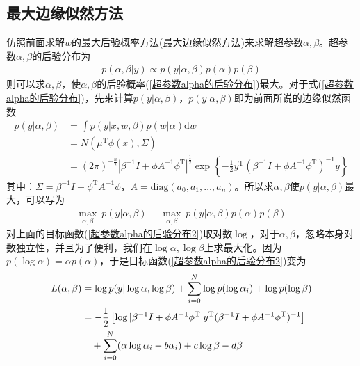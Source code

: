     \subsection{最大边缘似然方法}
        \par
        仿照前面求解$w$的最大后验概率方法(最大边缘似然方法)来求解超参数$\alpha,\beta$。超参数$\alpha,\beta$的后验分布为
        \begin{align}
        \label{超参数alpha的后验分布}
        p(\alpha,\beta|y) \propto p(y|\alpha,\beta) p(\alpha) p(\beta)
        \end{align}
        则可以求$\alpha,\beta$，使$\alpha,\beta$的后验概率(\ref{超参数alpha的后验分布})最大。对于式(\ref{超参数alpha的后验分布})，先来计算$p(y|\alpha,\beta)$，$p(y|\alpha,\beta)$即为前面所说的边缘似然函数
        \begin{align*}
        p(y|\alpha,\beta) &= \int p(y|x,w,\beta) p(w|\alpha) \mathrm{d}w\\
        &=N(\mu ^\mathrm{T}\phi(x),\Sigma) \\
        &=(2\pi)^{-\frac{n}{2}} |\beta^{-1}I + \phi A^{-1}\phi^\mathrm{T} |^{\frac{1}{2}} \exp\left\{ -\frac{1}{2} y^\mathrm{T} (\beta^{-1}I + \phi A^{-1}\phi^\mathrm{T})^{-1}y  \right\}
        \end{align*}
        其中：$\Sigma = \beta^{-1}I + \phi^\mathrm{T}A^{-1}\phi $，$A = \mathrm{diag}(a_0,a_1,\dots,a_n)$。所以求$\alpha,\beta$使$p(y|\alpha,\beta)$最大，可以写为
        \begin{align}
        \label{超参数alpha的后验分布2}
        \max_{\alpha,\beta} \ p(y|\alpha,\beta) \equiv \max_{\alpha,\beta} \ p(y|\alpha,\beta) p(\alpha)p(\beta)
        \end{align}
        对上面的目标函数(\ref{超参数alpha的后验分布2})取对数$\log$，对于$\alpha,\beta$，忽略本身对数独立性，并且为了便利，我们在$\log \alpha,\log \beta$上求最大化。因为$p(\log \alpha) = \alpha p(\alpha)$，于是目标函数(\ref{超参数alpha的后验分布2})变为
        \begin{align}
        \label{超参数alpha的后验分布3}
        L(\alpha,\beta) &= \log p(y|\log\alpha,\log\beta) + \sum_{i=0}^N \log p(\log \alpha_i) + \log p(\log \beta) \notag\\
        &=-\frac{1}{2} \left[ \log |\beta^{-1}I+\phi A^{-1}\phi^\mathrm{T}| y^\mathrm{T}( \beta^{-1}I+\phi A^{-1}\phi^\mathrm{T} )^{-1} \right] \notag\\
        &\quad + \sum_{i=0}^N(\alpha \log \alpha_i - b\alpha_i)+ c\log \beta - d\beta
        \end{align}
